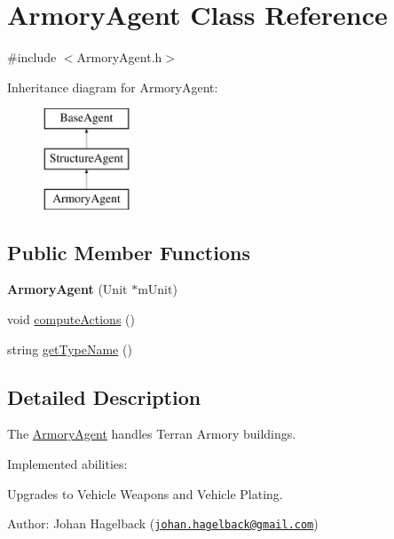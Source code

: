 \hypertarget{class_armory_agent}{
\section{ArmoryAgent Class Reference}
\label{class_armory_agent}
}


{\ttfamily \#include $<$ArmoryAgent.h$>$}

Inheritance diagram for ArmoryAgent:\begin{figure}[H]
\begin{center}
\leavevmode
\includegraphics[height=3.000000cm]{class_armory_agent}
\end{center}
\end{figure}
\subsection*{Public Member Functions}
\begin{DoxyCompactItemize}
\item 
\hypertarget{class_armory_agent_a59eb82048b9445eb9bf03b46ac8e7cb1}{
{\bfseries ArmoryAgent} (Unit $\ast$mUnit)}
\label{class_armory_agent_a59eb82048b9445eb9bf03b46ac8e7cb1}

\item 
void \hyperlink{class_armory_agent_a202fd67da8264417228978554d8bef1c}{computeActions} ()
\item 
string \hyperlink{class_armory_agent_ae3ce414b71648d56e63c2f210552db7a}{getTypeName} ()
\end{DoxyCompactItemize}


\subsection{Detailed Description}
The \hyperlink{class_armory_agent}{ArmoryAgent} handles Terran Armory buildings.

Implemented abilities:
\begin{DoxyItemize}
\item Upgrades to Vehicle Weapons and Vehicle Plating.
\end{DoxyItemize}

Author: Johan Hagelback (\href{mailto:johan.hagelback@gmail.com}{\tt johan.hagelback@gmail.com}) 

